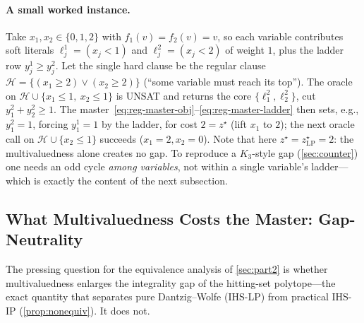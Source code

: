 \paragraph{A small worked instance.} Take $x_1, x_2 \in \{0,1,2\}$ with
$f_1(v)=f_2(v)=v$, so each variable contributes soft literals
$\ell_j^{1}=(x_j<1)$ and $\ell_j^{2}=(x_j<2)$ of weight $1$, plus the ladder row
$y_j^{1} \ge y_j^{2}$. Let the single hard clause be the regular clause
$\mathcal{H} = \{(x_1 \ge 2)\vee(x_2 \ge 2)\}$ (``some variable must reach its
top''). The oracle on $\mathcal{H}\cup\{x_1\le1,\ x_2\le1\}$ is UNSAT and returns
the core $\{\ell_1^{2},\ell_2^{2}\}$, cut $y_1^{2}+y_2^{2}\ge1$. The
master~\eqref{eq:reg-master-obj}--\eqref{eq:reg-master-ladder} then sets, e.g.,
$y_1^{2}=1$, forcing $y_1^{1}=1$ by the ladder, for cost $2 = z^\star$ (lift
$x_1$ to $2$); the next oracle call on $\mathcal{H}\cup\{x_2\le1\}$ succeeds
($x_1=2, x_2=0$). Note that here $z^\star = z^\star_{\mathrm{LP}} = 2$: the
multivaluedness alone creates no gap. To reproduce a $K_3$-style gap
(\cref{sec:counter}) one needs an odd cycle \emph{among variables}, not within a
single variable's ladder---which is exactly the content of the next subsection.

\subsection{What Multivaluedness Costs the Master: Gap-Neutrality}
\label{sec:regular-gap}

The pressing question for the equivalence analysis of \cref{sec:part2} is
whether multivaluedness enlarges the integrality gap of the hitting-set
polytope---the exact quantity that separates pure Dantzig--Wolfe (IHS-LP) from
practical IHS-IP (\cref{prop:nonequiv}). It does not.


